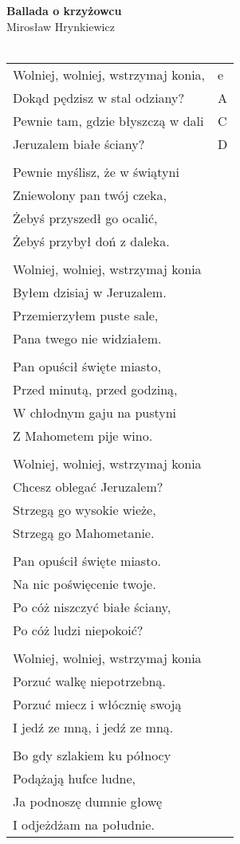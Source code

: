 \documentclass[a5paper]{article}
\begin{document}


\noindent
\fontsize{12pt}{15pt}\selectfont
\textbf{Ballada o krzyżowcu} \\
\fontsize{8pt}{10pt}\selectfont
Mirosław Hrynkiewicz \\ \\
\fontsize{10pt}{12pt}\selectfont
{}
\begin{tabular}{@{}p{7.5cm}p{3cm}@{}}
\noindent
Wolniej, wolniej, wstrzymaj konia, & e \\
Dokąd pędzisz w stal odziany? & A \\
Pewnie tam, gdzie błyszczą w dali & C \\
Jeruzalem białe ściany? & D \\ \\

Pewnie myślisz, że w świątyni \\
Zniewolony pan twój czeka, \\
Żebyś przyszedł go ocalić, \\
Żebyś przybył doń z daleka. \\ \\

Wolniej, wolniej, wstrzymaj konia\\
Byłem dzisiaj w Jeruzalem.\\
Przemierzyłem puste sale,\\
Pana twego nie widziałem.\\\\

Pan opuścił święte miasto, \\
Przed minutą, przed godziną,\\
W chłodnym gaju na pustyni\\
Z Mahometem pije wino.\\\\

Wolniej, wolniej, wstrzymaj konia\\
Chcesz oblegać Jeruzalem?\\
Strzegą go wysokie wieże,\\
Strzegą go Mahometanie.\\\\

Pan opuścił święte miasto.\\
Na nic poświęcenie twoje.\\
Po cóż niszczyć białe ściany,\\
Po cóż ludzi niepokoić?\\\\

Wolniej, wolniej, wstrzymaj konia\\
Porzuć walkę niepotrzebną.\\
Porzuć miecz i włócznię swoją\\
I jedź ze mną, i jedź ze mną.\\\\

Bo gdy szlakiem ku północy\\
Podążają hufce ludne,\\
Ja podnoszę dumnie głowę\\
I odjeżdżam na południe.
\end{tabular}
\end{document}
